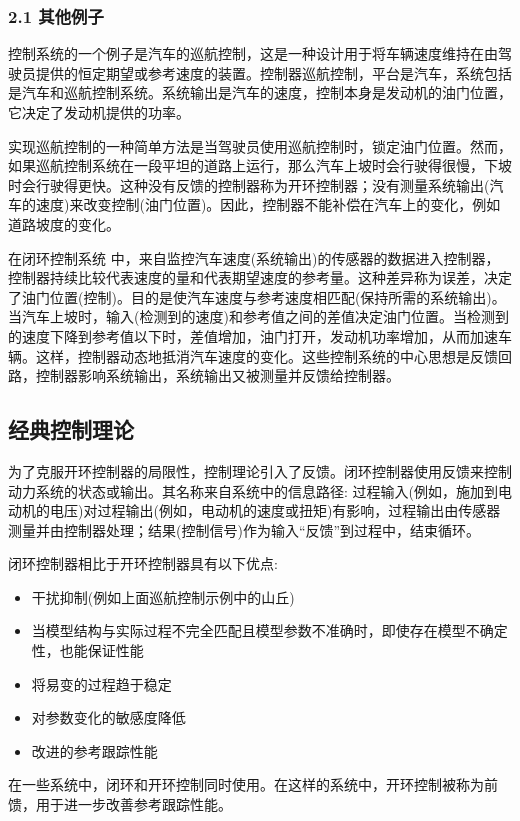 \subsubsection{2.1 其他例子}

控制系统的一个例子是汽车的巡航控制，这是一种设计用于将车辆速度维持在由驾驶员提供的恒定期望或参考速度的装置。控制器巡航控制，平台是汽车，系统包括是汽车和巡航控制系统。系统输出是汽车的速度，控制本身是发动机的油门位置，它决定了发动机提供的功率。

实现巡航控制的一种简单方法是当驾驶员使用巡航控制时，锁定油门位置。然而，如果巡航控制系统在一段平坦的道路上运行，那么汽车上坡时会行驶得很慢，下坡时会行驶得更快。这种没有反馈的控制器称为开环控制器；没有测量系统输出(汽车的速度)来改变控制(油门位置)。因此，控制器不能补偿在汽车上的变化，例如道路坡度的变化。

在闭环控制系统 中，来自监控汽车速度(系统输出)的传感器的数据进入控制器，控制器持续比较代表速度的量和代表期望速度的参考量。这种差异称为误差，决定了油门位置(控制)。目的是使汽车速度与参考速度相匹配(保持所需的系统输出)。当汽车上坡时，输入(检测到的速度)和参考值之间的差值决定油门位置。当检测到的速度下降到参考值以下时，差值增加，油门打开，发动机功率增加，从而加速车辆。这样，控制器动态地抵消汽车速度的变化。这些控制系统的中心思想是反馈回路，控制器影响系统输出，系统输出又被测量并反馈给控制器。

\subsection{经典控制理论}

为了克服开环控制器的局限性，控制理论引入了反馈。闭环控制器使用反馈来控制动力系统的状态或输出。其名称来自系统中的信息路径: 过程输入(例如，施加到电动机的电压)对过程输出(例如，电动机的速度或扭矩)有影响，过程输出由传感器测量并由控制器处理；结果(控制信号)作为输入“反馈”到过程中，结束循环。

闭环控制器相比于开环控制器具有以下优点:

\begin{itemize}
\item 干扰抑制(例如上面巡航控制示例中的山丘)
\item 当模型结构与实际过程不完全匹配且模型参数不准确时，即使存在模型不确定性，也能保证性能
\item 将易变的过程趋于稳定
\item 对参数变化的敏感度降低
\item 改进的参考跟踪性能
\end{itemize}

在一些系统中，闭环和开环控制同时使用。在这样的系统中，开环控制被称为前馈，用于进一步改善参考跟踪性能。

